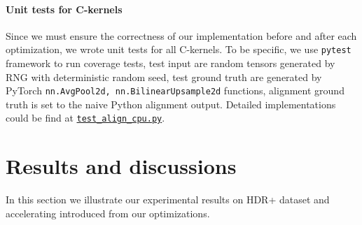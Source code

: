 \documentclass[conference, 10pt]{IEEEtran}
\begin{document}
\paragraph{Unit tests for C-kernels} Since we must ensure the correctness of our
implementation before and after each optimization, we wrote unit tests for all C-kernels.
To be specific, we use {\tt pytest} framework to run coverage tests, test input are
random tensors generated by RNG with deterministic random seed, test ground truth
are generated by PyTorch {\tt nn.AvgPool2d, nn.BilinearUpsample2d} functions, alignment
ground truth is set to the naive Python alignment output. Detailed implementations
could be find at \href{https://github.com/CrazyRundong/burst-align/blob/master/test/test_align_cpu.py}{\tt test\_align\_cpu.py}.

\section{Results and discussions} \label{sec::exp}

In this section we illustrate our experimental results on HDR+ dataset \cite{hasinoff2016burst}
and accelerating introduced from our optimizations.
\end{document}
